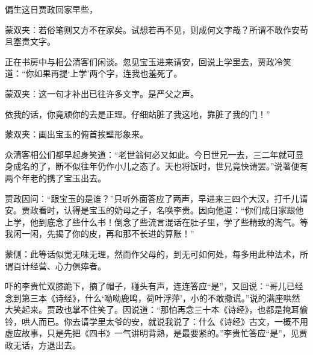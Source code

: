 \begin{parag}
    偏生这日贾政回家早些，\begin{note}蒙双夹：若俗笔则又方不在家矣。试想若再不见，则成何文字哉？所谓不敢作安苟且塞责文字。\end{note}正在书房中与相公清客们闲谈。忽见宝玉进来请安，回说上学里去，贾政冷笑道：“你如果再提‘上学’两个字，连我也羞死了。\begin{note}蒙双夹：这一句才补出已往许多文字。是严父之声。\end{note}依我的话，你竟顽你的去是正理。仔细站脏了我这地，靠脏了我的门！”\begin{note}蒙双夹：画出宝玉的俯首挨壁形象来。\end{note}众清客相公们都早起身笑道：“老世翁何必又如此。今日世兄一去，三二年就可显身成名的了，断不似往年仍作小儿之态了。天也将饭时，世兄竟快请罢。”说著便有两个年老的携了宝玉出去。
\end{parag}


\begin{parag}
    贾政因问：“跟宝玉的是谁？”只听外面答应了两声，早进来三四个大汉，打千儿请安。贾政看时，认得是宝玉的奶母之子，名唤李贵。因向他道：“你们成日家跟他上学，他到底念了些什么书！倒念了些流言混话在肚子里，学了些精致的淘气。等我闲一闲，先揭了你的皮，再和那不长进的算账！”\begin{note}蒙侧：此等话似觉无味无理，然而作父母的，到无可如何处，每多用此种法术，所谓百计经营、心力俱瘁者。\end{note}吓的李贵忙双膝跪下，摘了帽子，碰头有声，连连答应“是”，又回说：“哥儿已经念到第三本《诗经》，什么‘呦呦鹿鸣，荷叶浮萍’，小的不敢撒谎。”说的满座哄然大笑起来。贾政也掌不住笑了。因说道：“那怕再念三十本《诗经》，也都是掩耳偷铃，哄人而已。你去请学里太爷的安，就说我说了：什么《诗经》古文，一概不用虚应故事，只是先把《四书》一气讲明背熟，是最要紧的。”李贵忙答应“是”，见贾政无话，方退出去。
\end{parag}


